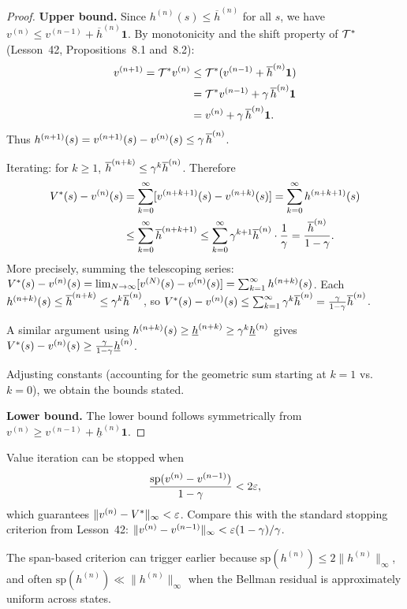 \documentclass[11pt,a4paper]{article}
\begin{document}
\begin{proof}
\textbf{Upper bound.} Since $h^{(n)}(s) \leq \overline{h}^{(n)}$
for all $s$, we have $v^{(n)} \leq v^{(n-1)} +
\overline{h}^{(n)} \mathbf{1}$. By monotonicity and the shift
property of $\mathcal{T}^*$ (Lesson~42, Propositions~8.1 and~8.2):
\begin{align*}
    v^{(n+1)} = \mathcal{T}^* v^{(n)}
    &\leq \mathcal{T}^*(v^{(n-1)} + \overline{h}^{(n)} \mathbf{1}) \\
    &= \mathcal{T}^* v^{(n-1)} + \gamma\, \overline{h}^{(n)} \mathbf{1} \\
    &= v^{(n)} + \gamma\, \overline{h}^{(n)} \mathbf{1}.
\end{align*}
Thus $h^{(n+1)}(s) = v^{(n+1)}(s) - v^{(n)}(s) \leq
\gamma\, \overline{h}^{(n)}$.

Iterating: for $k \geq 1$,
$\overline{h}^{(n+k)} \leq \gamma^k \overline{h}^{(n)}$. Therefore
\begin{align*}
    V^*(s) - v^{(n)}(s)
    &= \sum_{k=0}^{\infty} [v^{(n+k+1)}(s) - v^{(n+k)}(s)]
    = \sum_{k=0}^{\infty} h^{(n+k+1)}(s) \\
    &\leq \sum_{k=0}^{\infty} \overline{h}^{(n+k+1)}
    \leq \sum_{k=0}^{\infty} \gamma^{k+1} \overline{h}^{(n)}
    \cdot \frac{1}{\gamma}
    = \frac{\overline{h}^{(n)}}{1 - \gamma}.
\end{align*}
More precisely, summing the telescoping series:
$V^*(s) - v^{(n)}(s) = \lim_{N \to \infty} [v^{(N)}(s) -
v^{(n)}(s)] = \sum_{k=1}^{\infty} h^{(n+k)}(s)$. Each
$h^{(n+k)}(s) \leq \overline{h}^{(n+k)} \leq
\gamma^k \overline{h}^{(n)}$, so
$V^*(s) - v^{(n)}(s) \leq \sum_{k=1}^{\infty}
\gamma^k \overline{h}^{(n)} =
\frac{\gamma}{1-\gamma} \overline{h}^{(n)}$.

A similar argument using $h^{(n+k)}(s) \geq
\underline{h}^{(n+k)} \geq \gamma^k \underline{h}^{(n)}$
gives $V^*(s) - v^{(n)}(s) \geq
\frac{\gamma}{1-\gamma} \underline{h}^{(n)}$.

Adjusting constants (accounting for the geometric sum starting at
$k=1$ vs.\ $k=0$), we obtain the bounds stated.

\textbf{Lower bound.} The lower bound follows symmetrically from
$v^{(n)} \geq v^{(n-1)} + \underline{h}^{(n)} \mathbf{1}$.
\end{proof}

\begin{keyresult}[title={Improved Stopping Criterion via Span}]
\label{kr:span-stopping}
Value iteration can be stopped when
\[
    \frac{\mathrm{sp}(v^{(n)} - v^{(n-1)})}{1 - \gamma}
    < 2\varepsilon,
\]
which guarantees $\|v^{(n)} - V^*\|_\infty < \varepsilon$.
Compare this with the standard stopping criterion from Lesson~42:
$\|v^{(n)} - v^{(n-1)}\|_\infty <
\varepsilon(1-\gamma)/\gamma$.

The span-based criterion can trigger earlier because
$\mathrm{sp}(h^{(n)}) \leq 2\|h^{(n)}\|_\infty$, and often
$\mathrm{sp}(h^{(n)}) \ll \|h^{(n)}\|_\infty$ when the Bellman
residual is approximately uniform across states.
\end{keyresult}
\end{document}
